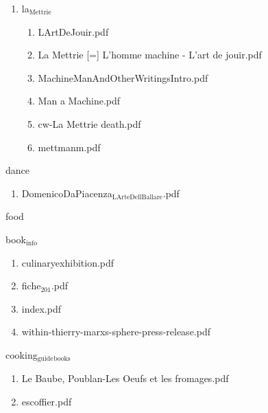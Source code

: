 \documentclass[11pt]{article}
\begin{document}
\begin{enumerate}
\item la$_{\text{Mettrie}}$
\label{sec-1-1-1-1-19-16}
\begin{enumerate}
\item LArtDeJouir.pdf
\label{sec-1-1-1-1-19-16-1}

\item La Mettrie [=] L'homme machine - L'art de jouir.pdf
\label{sec-1-1-1-1-19-16-2}

\item MachineManAndOtherWritingsIntro.pdf
\label{sec-1-1-1-1-19-16-3}

\item Man a Machine.pdf
\label{sec-1-1-1-1-19-16-4}

\item cw-La Mettrie death.pdf
\label{sec-1-1-1-1-19-16-5}

\item mettmanm.pdf
\label{sec-1-1-1-1-19-16-6}
\end{enumerate}
\end{enumerate}

\item dance
\label{sec-1-1-1-1-20}
\begin{enumerate}
\item DomenicoDaPiacenza$_{\text{LArteDellBallare}}$.pdf
\label{sec-1-1-1-1-20-1}
\end{enumerate}

\item food
\label{sec-1-1-1-1-21}

\item book$_{\text{info}}$
\label{sec-1-1-1-1-21-2}
\begin{enumerate}
\item culinaryexhibition.pdf
\label{sec-1-1-1-1-21-2-1}

\item fiche$_{\text{201}}$.pdf
\label{sec-1-1-1-1-21-2-2}

\item index.pdf
\label{sec-1-1-1-1-21-2-3}

\item within-thierry-marxs-sphere-press-release.pdf
\label{sec-1-1-1-1-21-2-4}
\end{enumerate}

\item cooking$_{\text{guide}}$$_{\text{books}}$
\label{sec-1-1-1-1-21-3}
\begin{enumerate}
\item Le Baube, Poublan-Les Oeufs et les fromages.pdf
\label{sec-1-1-1-1-21-3-1}

\item escoffier.pdf
\label{sec-1-1-1-1-21-3-2}
\end{enumerate}
\end{document}
